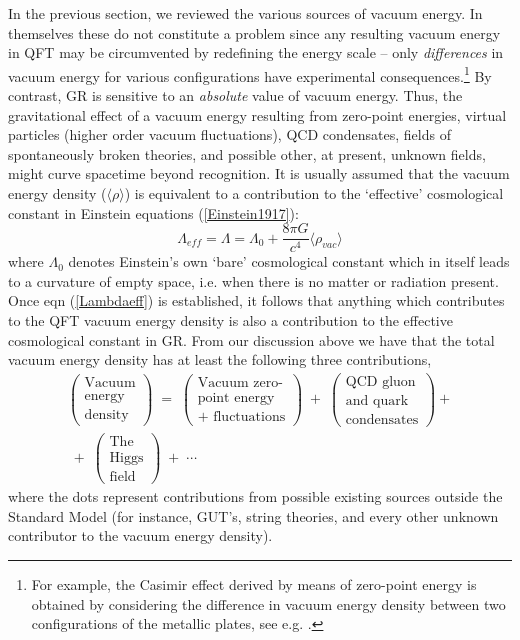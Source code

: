 \documentclass[12pt]{article}
\begin{document}
In the previous section, we reviewed the various sources of vacuum
energy. In themselves these do not constitute a problem since any
resulting vacuum energy in QFT may be circumvented by redefining the
energy scale -- only {\em differences} in vacuum energy for various
configurations have experimental consequences.\footnote{For example,
the Casimir effect derived by means of zero-point energy is obtained
by considering the difference in vacuum energy density between two
configurations of the metallic plates, see e.g.
\cite{rugh98}.} By contrast, GR is sensitive
to an {\em absolute} value of vacuum energy. Thus, the
gravitational effect of a vacuum energy resulting from zero-point
energies, virtual particles (higher order vacuum fluctuations),
QCD condensates, fields of spontaneously broken theories, and
possible other, at present, unknown fields, might curve spacetime
beyond recognition. It is usually assumed that the vacuum energy
density ($\langle \rho \rangle$) is equivalent to a contribution to the `effective'
cosmological constant in Einstein equations (\ref{Einstein1917}): 
\begin{equation} \label{Lambdaeff}
\Lambda_{eff} = \Lambda = \Lambda_{0} + \frac{8 \pi G}{c^4} \langle \rho _{vac} \rangle
\end{equation}
where $\Lambda_0$ denotes Einstein's own `bare' cosmological constant
which in itself leads to a curvature of empty space, i.e. when there is no
matter or radiation present.
Once eqn (\ref{Lambdaeff}) is  established, it follows that
anything which contributes to the QFT vacuum energy density is also a
contribution to the effective cosmological constant in GR. From
our discussion above we have that the total vacuum energy density has
at least the following three contributions,
\begin{multline} \label{Energyeff}
\left(
\begin{array}{c}
\mbox{Vacuum} \\
\mbox{energy}\\
\mbox{density} 
\end{array}
\right) \; = \;
\left(
\begin{array}{c}
\mbox{Vacuum zero-} \\
\mbox{point energy}\\
\mbox{+ fluctuations} 
\end{array}
\right) \; + \;
\left(
\begin{array}{c}
\mbox{QCD gluon} \\
\mbox{and quark} \\
\mbox{condensates}
\end{array}
\right) + \\ \; + \;
\left(
\begin{array}{c}
\mbox{The} \\
\mbox{Higgs} \\
\mbox{field}
\end{array}
\right)
\; + \; \cdots
\end{multline}
\noindent
where the dots represent contributions from possible existing
sources outside the Standard Model (for instance, GUT's, string 
theories, and every other unknown contributor to
the vacuum energy density). 
\end{document}
